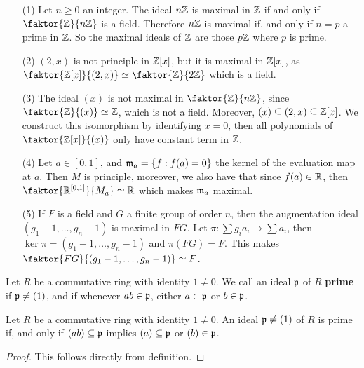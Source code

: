 \begin{example}\label{example_5.15}
  \begin{enumerate}
    \item[(1)] Let $n \geq 0$ an integer. The ideal  $n\mathbb{Z}$ is maximal in
      $\mathbb{Z}$ if and only if  $\faktor{\Z}{n\Z}$ is a field. Therefore $n\mathbb{Z}$
      is maximal if, and only if  $n=p$ a prime in $\mathbb{Z}$. So the maximal
      ideals of $\mathbb{Z}$ are those  $p\mathbb{Z}$ where  $p$ is prime.

    \item[(2)] $(2,x)$ is not principle in $\mathbb{Z}[x]$, but it is maximal in
      $\mathbb{Z}[x]$, as $\faktor{\Z[x]}{(2,x)} \simeq \faktor{\Z}{2\Z}$ which
      is a field.

    \item[(3)] The ideal $(x)$ is not maximal in $\faktor{\Z}{n\Z}$, since
      $\faktor{\Z}{(x)} \simeq \Z$, which is not a field. Moreover, $(x)
      \subseteq (2,x) \subseteq \mathbb{Z}[x]$. We construct this isomorphism by
      identifying $x=0$, then all polynomials of $\faktor{\Z[x]}{(x)}$ only
      have constant term in $\mathbb{Z}$.

    \item[(4)] Let $a \in [0,1]$, and $\mathfrak{m}_a=\{f : f(a)=0\}$ the kernel of the
      evaluation map at $a$. Then  $M$ is principle, moreover, we also
      have that since  $f(a) \in \mathbb{R}$, then $\faktor{\R^{[0,1]}}{M_a}
      \simeq \R$ which makes $\mathfrak{m}_a$ maximal.

    \item[(5)] If $F$ is a field and  $G$ a finite group of order $n$, then
      the augmentation ideal  $(g_1-1, \dots, g_n-1)$ is maximal in $FG$.
      Let $\pi:\sum{g_ia_i} \xrightarrow{} \sum{a_i}$, then
      $\ker{\pi}=(g_1-1, \dots, g_n-1)$ and $\pi(FG)=F$. This makes
      $\faktor{FG}{(g_1-1, \dots, g_n-1)} \simeq F$.
  \end{enumerate}
\end{example}

\begin{definition}
  Let $R$ be a commutative ring with identity  $1 \neq 0$. We call an
  ideal $\mathfrak{p}$ of $R$ \textbf{prime} if $\mathfrak{p} \neq (1)$, and if whenever
  $ab \in \mathfrak{p}$, either $a \in \mathfrak{p}$ or $b \in \mathfrak{p}$.
\end{definition}

\begin{lemma}\label{lemma_5.4.5}
  Let $R$ be a commutative ring with identity $1 \neq 0$. An ideal
  $\mathfrak{p} \neq (1)$ of $R$ is prime if, and only if $(ab) \subseteq \mathfrak{p}$
  implies $(a) \subseteq \mathfrak{p}$ or $(b) \in \mathfrak{p}$.
\end{lemma}
\begin{proof}
  This follows directly from definition.
\end{proof}

